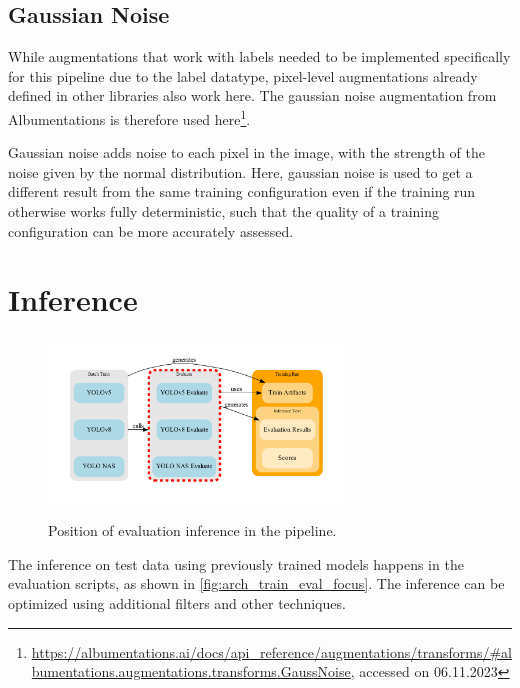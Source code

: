 \documentclass[10pt]{book}
\newcommand{\figureref}[1]{\autoref{#1}}
\begin{document}
\subsection{Gaussian Noise}

While augmentations that work with labels needed to be implemented specifically for this pipeline due to the label datatype, pixel-level augmentations already defined in other libraries also work here. The gaussian noise augmentation from Albumentations is therefore used here\footnote{\url{https://albumentations.ai/docs/api\_reference/augmentations/transforms/\#albumentations.augmentations.transforms.GaussNoise}, accessed on 06.11.2023}. 

Gaussian noise adds noise to each pixel in the image, with the strength of the noise given by the normal distribution. Here, gaussian noise is used to get a different result from the same training configuration even if the training run otherwise works fully deterministic, such that the quality of a training configuration can be more accurately assessed.


\section{Inference}

\begin{figure}
  \caption{Position of evaluation inference in the pipeline.}
  \includegraphics[width=0.7\textwidth]{graph/arch_train_eval_focus}
  \label{fig:arch_train_eval_focus}
\end{figure}

The inference on test data using previously trained models happens in the evaluation scripts, as shown in \figureref{fig:arch_train_eval_focus}. The inference can be optimized using additional filters and other techniques. 
\end{document}
